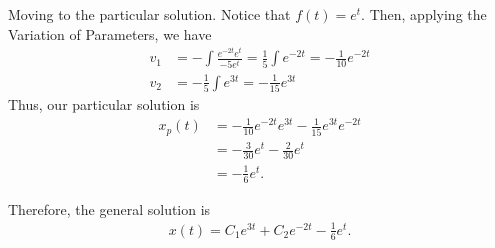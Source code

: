 \documentclass[12pt]{article}
\begin{document}
Moving to the particular solution. Notice that $f(t) = e^t$.
Then, applying the Variation of Parameters, we have
\begin{align*}
    v_1 & = -\int \frac{e^{-2t}e^t}{-5e^t} = \frac{1}{5}\int e^{-2t} = -\frac{1}{10}e^{-2t} \\
    v_2 & = -\frac{1}{5}\int e^{3t} = -\frac{1}{15} e^{3t}
\end{align*}
Thus, our particular solution is
\begin{align*}
    x_p(t) & = - \frac{1}{10}e^{-2t}e^{3t} - \frac{1}{15} e^{3t}e^{-2t} \\
           & = - \frac{3}{30} e^t - \frac{2}{30}e^t                     \\
           & = - \frac{1}{6} e^t.
\end{align*}

Therefore, the general solution is
\begin{align*}
    x(t) = C_1e^{3t} + C_2e^{-2t} - \frac{1}{6}e^t.
\end{align*}
\end{document}
